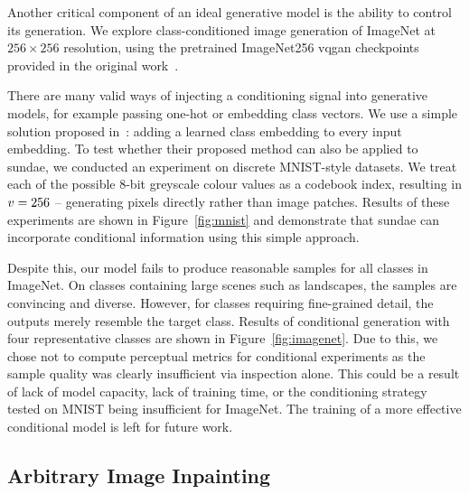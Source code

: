 Another critical component of an ideal generative model is the ability to
control its generation. We explore class-conditioned image generation of
ImageNet at $256 \times 256$ resolution, using the pretrained ImageNet256
\gls{vqgan} checkpoints provided in the original work~\cite{esser2021taming}. 

There are many valid ways of injecting a conditioning signal into generative
models, for example passing one-hot or embedding class vectors. We use a simple
solution proposed in~\cite{parmar2018image}: adding a learned class embedding to
every input embedding. To test whether their proposed method can also be applied
to \gls{sundae}, we conducted an experiment on discrete MNIST-style datasets. We
treat each of the possible 8-bit greyscale colour values as a codebook
index, resulting in $v = 256$ -- generating pixels directly rather
than image patches. Results of these experiments are shown in
Figure~\ref{fig:mnist} and demonstrate that \gls{sundae} can incorporate
conditional information using this simple approach.

Despite this, our model fails to produce reasonable samples for all classes in
ImageNet. On classes containing large scenes such as landscapes, the samples
are convincing and diverse. However, for classes requiring fine-grained detail,
the outputs merely resemble the target class. Results of conditional generation
with four representative classes are shown in Figure~\ref{fig:imagenet}. Due to
this, we chose not to compute perceptual metrics for conditional experiments as
the sample quality was clearly insufficient via inspection alone. This could be
a result of lack of model capacity, lack of training time, or the conditioning
strategy tested on MNIST being insufficient for ImageNet. The training of a more
effective conditional model is left for future work.

\subsection{Arbitrary Image Inpainting}
\label{subsec:evaluationInpainting}

